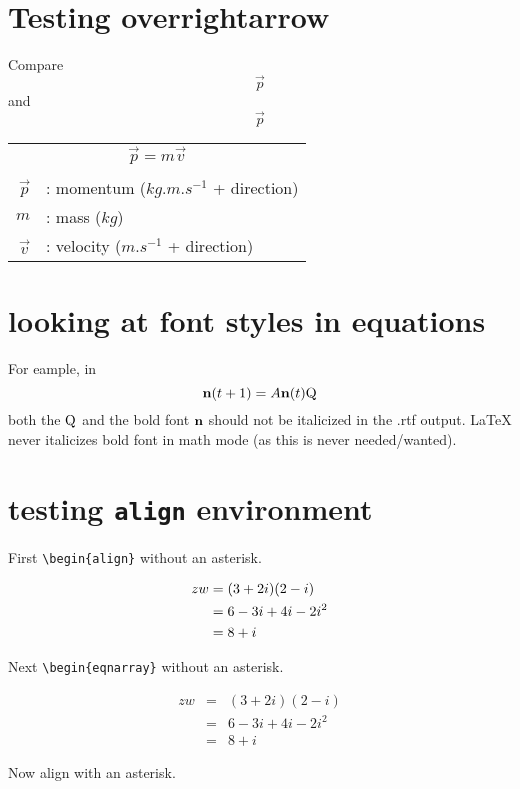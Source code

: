 \documentclass{article}
\begin{document}
\section{Testing overrightarrow}

Compare
$$
\vec{p} 
$$
and
$$
\overrightarrow{p}
$$

\begin{tabular}{rl}
\multicolumn{2}{c}{$\overrightarrow{p} = m\overrightarrow{v}$}\\
\\
$\overrightarrow{p}$&: momentum ($kg.m.s^{-1}$ + direction)\\
$m$&: mass ($kg$)\\
$\overrightarrow{v}$&: velocity ($m.s^{-1}$ + direction)\\
\end{tabular}

\section{looking at font styles in equations}

For eample, in
\[ 
{\bf n}(t+1) = A {\bf n}(t) {\rm Q} 
\] 
both the $\rm Q$ and the bold font $\bf n$ should not be
italicized in the  .rtf output. LaTeX never italicizes bold font in math 
mode (as this is never needed/wanted). 

\section{testing \texttt{align} environment}

First \verb#\begin{align}# without an asterisk.

\begin{align} 
zw &=  (3+2i)(2-i) \notag \\ 
&=  6-3i+4i-2i^2   \notag \\ 
&=  8+i  \notag 
\end{align} 

Next \verb#\begin{eqnarray}# without an asterisk.

\begin{eqnarray} 
zw &=&  (3+2i)(2-i) \nonumber \\ 
&=&  6-3i+4i-2i^2   \nonumber \\ 
&=&  8+i  \nonumber 
\end{eqnarray} 


Now align with an asterisk.
\end{document}
